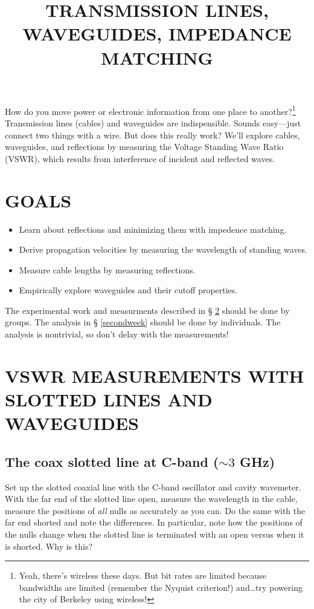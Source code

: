 \documentclass[preprint]{aastex}
\begin{document}

\def\simlt{\lower.5ex\hbox{$\; \buildrel < \over \sim \;$}}
\def\simgt{\lower.5ex\hbox{$\; \buildrel > \over \sim \;$}}


\title  {TRANSMISSION LINES, WAVEGUIDES, IMPEDANCE MATCHING}

How do you move power or electronic information from one place to
another?\footnote{Yeah, there's wireless these days. But bit rates are
  limited because bandwidths are limited (remember the Nyquist criterion!)
  and\dots try powering the city of Berkeley using wireless!} Transmission
lines (cables) and waveguides are indispensible. Sounds easy---just connect
two things with a wire. But does this really work? We'll explore cables,
waveguides, and reflections by measuring the Voltage Standing Wave
Ratio (VSWR), which results from interference of incident and reflected
waves.

\section{GOALS}

\begin{itemize}

\item Learn about reflections and minimizing them with impedence
  matching. 

\item Derive propagation velocities by measuring the wavelength of
  standing waves.

\item Measure cable lengths by measuring reflections. 

\item Empirically explore waveguides and their cutoff properties.

\end{itemize}

	The experimental work and measurments described in \S
\ref{expt} should be done by groups.  The analysis in \S
\ref{secondweek} should be done by individuals. The analysis is
nontrivial, so don't delay with the measurements!

\section {VSWR MEASUREMENTS WITH SLOTTED LINES
AND WAVEGUIDES} \label{expt}

{\boldmath
\subsection {The coax slotted line at C-band ($\sim 3$ GHz)} \label{slotted}
}
	Set up the slotted coaxial line with the C-band oscillator and
cavity wavemeter.  With the far end of the slotted line open, measure
the wavelength in the cable, measure the positions of {\it all} nulls as
accurately as you can.  Do the same with the far end shorted and note
the differences.  In particular, note how the positions of the nulls
change when the slotted line is terminated with an open versus when it
is shorted.  Why is this?
\end{document}

